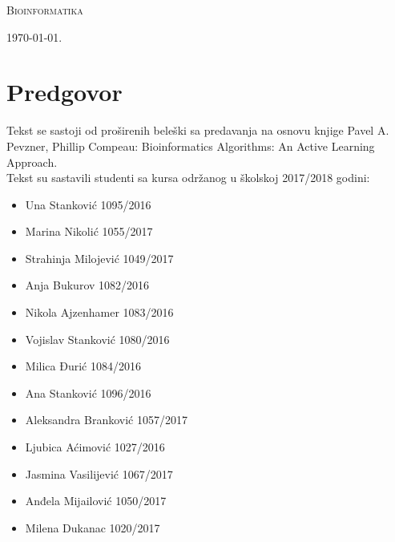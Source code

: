 \documentclass[a4paper]{book}
\begin{document}
\begin{titlepage}
	\vspace*{0.4\textheight}
	
	\begin{center}
		{\Huge \textsc{Bioinformatika}}
	\end{center}
	
	\vfill
	
	\begin{center}
		{\Large \today.}
	\end{center}
\end{titlepage}

\blankpage

\frontmatter
\tableofcontents
\blankpage

\chapter*{Predgovor}
Tekst se sastoji od proširenih beleški sa predavanja na osnovu knjige Pavel A. Pevzner, Phillip Compeau: Bioinformatics Algorithms: An Active Learning Approach. \\Tekst su sastavili studenti sa kursa održanog u školskoj 2017/2018 godini: 
\begin{itemize}
	\item Una Stanković 1095/2016
	\item Marina Nikolić 1055/2017
	\item Strahinja Milojević 1049/2017
	\item Anja Bukurov 1082/2016
	\item Nikola Ajzenhamer 1083/2016
	\item Vojislav Stanković 1080/2016
	\item Milica Đurić 1084/2016
	\item Ana Stanković 1096/2016
	\item Aleksandra Branković 1057/2017
	\item Ljubica Aćimović 1027/2016
	\item Jasmina Vasilijević 1067/2017
	\item Anđela Mijailović 1050/2017
	\item Milena Dukanac 1020/2017
\end{itemize}


\blankpage

\mainmatter






\backmatter
\renewcommand{\bibname}{Literatura}

\begingroup
\raggedright

\endgroup


\end{document}
